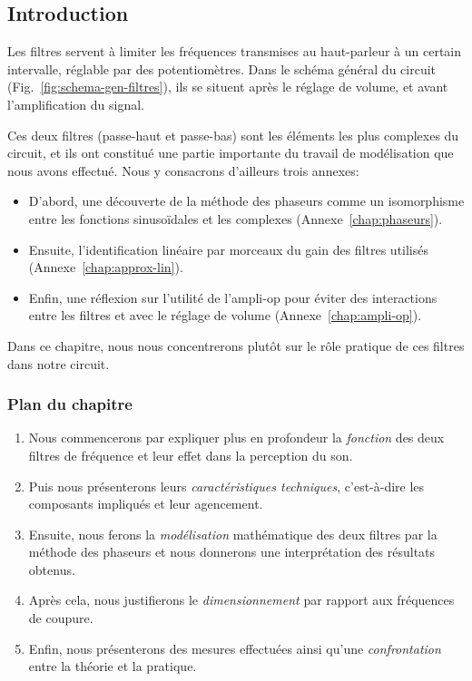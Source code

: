\subsection*{Introduction}

Les filtres servent à limiter les fréquences transmises au haut-parleur
à un certain intervalle, réglable par des potentiomètres.
Dans le schéma général du circuit (Fig.~\ref{fig:schema-gen-filtres}),
ils se situent après le réglage de volume, et avant l'amplification du signal.

Ces deux filtres (passe-haut et passe-bas) sont les éléments les plus complexes
du circuit, et ils ont constitué
une partie importante du travail de modélisation que nous avons effectué.
Nous y consacrons d'ailleurs trois annexes:
\begin{itemize}
    \item D'abord, une découverte de la méthode des phaseurs
        comme un isomorphisme
        entre les fonctions sinusoïdales et les complexes
        (Annexe~\ref{chap:phaseurs}).
    \item Ensuite,
        l'identification linéaire par morceaux du gain des filtres utilisés
        (Annexe~\ref{chap:approx-lin}).
    \item Enfin,
        une réflexion sur l'utilité de l'ampli-op pour éviter des
        interactions entre les filtres et avec le réglage de volume
        (Annexe~\ref{chap:ampli-op}).
\end{itemize}

Dans ce chapitre,
nous nous concentrerons plutôt sur le rôle pratique de ces filtres
dans notre circuit.

\subsubsection*{Plan du chapitre}
\begin{enumerate}
    \item Nous commencerons par expliquer plus en profondeur la \emph{fonction}
        des deux filtres de fréquence et leur effet dans la perception du son.
    \item Puis nous présenterons leurs \emph{caractéristiques techniques},
        c'est-à-dire les composants impliqués et leur agencement.
    \item Ensuite, nous ferons la \emph{modélisation} mathématique
        des deux filtres
        par la méthode des phaseurs et nous donnerons une interprétation
		des résultats obtenus.
    \item Après cela, nous justifierons le \emph{dimensionnement} par rapport
        aux fréquences de coupure.
    \item Enfin, nous présenterons des mesures effectuées ainsi qu'une
        \emph{confrontation} entre la théorie et la pratique.
\end{enumerate}



